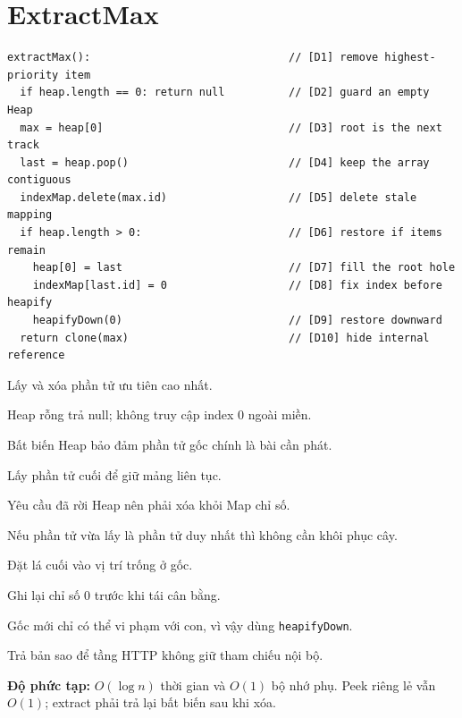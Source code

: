 \documentclass[12pt,a4paper,twoside,openright]{report}
\newcommand{\code}[1]{\texttt{#1}}
\begin{document}
\section{ExtractMax}
\begin{lstlisting}[style=algorithm]
extractMax():                               // [D1] remove highest-priority item
  if heap.length == 0: return null          // [D2] guard an empty Heap
  max = heap[0]                             // [D3] root is the next track
  last = heap.pop()                         // [D4] keep the array contiguous
  indexMap.delete(max.id)                   // [D5] delete stale mapping
  if heap.length > 0:                       // [D6] restore if items remain
    heap[0] = last                          // [D7] fill the root hole
    indexMap[last.id] = 0                   // [D8] fix index before heapify
    heapifyDown(0)                          // [D9] restore downward
  return clone(max)                         // [D10] hide internal reference
\end{lstlisting}
\begin{description}[leftmargin=1.2cm,labelwidth=0.8cm,style=multiline,
  font=\ttfamily\bfseries,itemsep=2pt]
  \item[D1] Lấy và xóa phần tử ưu tiên cao nhất.
  \item[D2] Heap rỗng trả null; không truy cập index 0 ngoài miền.
  \item[D3] Bất biến Heap bảo đảm phần tử gốc chính là bài cần phát.
  \item[D4] Lấy phần tử cuối để giữ mảng liên tục.
  \item[D5] Yêu cầu đã rời Heap nên phải xóa khỏi Map chỉ số.
  \item[D6] Nếu phần tử vừa lấy là phần tử duy nhất thì không cần khôi phục cây.
  \item[D7] Đặt lá cuối vào vị trí trống ở gốc.
  \item[D8] Ghi lại chỉ số 0 trước khi tái cân bằng.
  \item[D9] Gốc mới chỉ có thể vi phạm với con, vì vậy dùng \code{heapifyDown}.
  \item[D10] Trả bản sao để tầng HTTP không giữ tham chiếu nội bộ.
\end{description}
\textbf{Độ phức tạp:} $O(\log n)$ thời gian và $O(1)$ bộ nhớ phụ. Peek riêng lẻ vẫn
$O(1)$; extract phải trả lại bất biến sau khi xóa.

\end{document}
